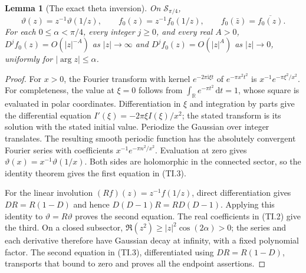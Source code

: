 \documentclass[11pt]{article}
\newtheorem{lemma}[theorem]{Lemma}
\newcommand{\ii}{\mathrm i}
\newcommand{\dd}{\,\mathrm d}
\begin{document}
\begin{lemma}[The exact theta inversion]
On $\mathcal S_{\pi/4}$,
\begin{equation}
 \vartheta(z)=z^{-1}\vartheta(1/z),\qquad
 f_0(z)=z^{-1}f_0(1/z),\qquad
 f_0(\bar z)=\overline{f_0(z)}. \tag{TI.3}
\end{equation}
For each $0\le\alpha<\pi/4$, every integer $j\ge0$, and every real
$A>0$, $D^jf_0(z)=O(|z|^{-A})$ as $|z|\to\infty$ and
$D^jf_0(z)=O(|z|^A)$ as $|z|\to0$, uniformly for $|\arg z|\le\alpha$.
\end{lemma}
\begin{proof}
For $x>0$, the Fourier transform with kernel $e^{-2\pi\ii\xi t}$
of $e^{-\pi x^2t^2}$ is $x^{-1}e^{-\pi\xi^2/x^2}$.
For completeness, the value at $\xi=0$ follows from
$\int_{\mathbb R}e^{-\pi t^2}\dd t=1$, whose square is evaluated in
polar coordinates. Differentiation in $\xi$ and integration by parts
give the differential equation $I'(\xi)=-2\pi\xi I(\xi)/x^2$;
the stated transform is its solution with the stated initial value.
Periodize the Gaussian over integer translates. The resulting smooth
periodic function has the absolutely convergent Fourier series with
coefficients $x^{-1}e^{-\pi n^2/x^2}$. Evaluation at zero gives
$\vartheta(x)=x^{-1}\vartheta(1/x)$. Both sides are holomorphic in
the connected sector, so the identity theorem gives the first equation
in (TI.3).

For the linear involution $(Rf)(z)=z^{-1}f(1/z)$, direct differentiation
gives $DR=R(1-D)$ and hence $D(D-1)R=RD(D-1)$. Applying this identity
to $\vartheta=R\vartheta$ proves the second equation. The real
coefficients in (TI.2) give the third. On a closed subsector,
$\Re(z^2)\ge |z|^2\cos(2\alpha)>0$; the series and each derivative
therefore have Gaussian decay at infinity, with a fixed polynomial
factor. The second equation in (TI.3), differentiated using $DR=R(1-D)$,
transports that bound to zero and proves all the endpoint assertions.
\end{proof}
\end{document}
